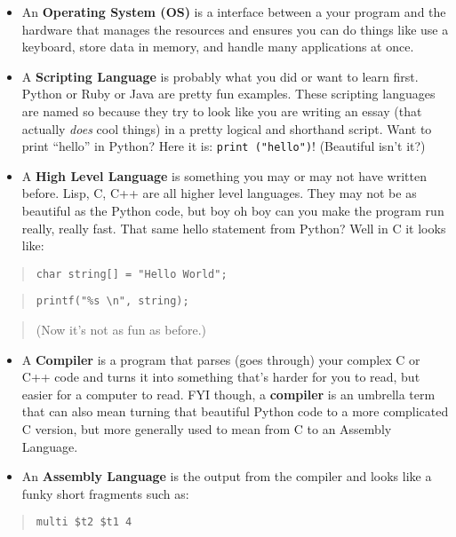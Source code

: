 \documentclass[landscape]{article}
\begin{document}
\begin{multicols}{3}
\begin{itemize}
\item
  An \textbf{Operating System (OS)} is a interface between a your
  program and the hardware that manages the resources and ensures you
  can do things like use a keyboard, store data in memory, and handle
  many applications at once.
\item
  A \textbf{Scripting Language} is probably what you did or want to
  learn first. Python or Ruby or Java are pretty fun examples. These
  scripting languages are named so because they try to look like you are
  writing an essay (that actually \emph{does} cool things) in a pretty
  logical and shorthand script. Want to print ``hello'' in Python? Here
  it is: \texttt{print ("hello")}! (Beautiful isn't it?)
\item
  A \textbf{High Level Language} is something you may or may not have
  written before. Lisp, C, C++ are all higher level languages. They may
  not be as beautiful as the Python code, but boy oh boy can you make
  the program run really, really fast. That same hello statement from
  Python? Well in C it looks like:
\end{itemize}

\begin{quote}
\texttt{char string{[}{]} = "Hello World";}
\end{quote}

\begin{quote}
\texttt{printf("\%s \textbackslash{}n", string);}
\end{quote}

\begin{quote}
(Now it's not as fun as before.)
\end{quote}

\begin{itemize}
\item
  A \textbf{Compiler} is a program that parses (goes through) your
  complex C or C++ code and turns it into something that's harder for
  you to read, but easier for a computer to read. FYI though, a
  \textbf{compiler} is an umbrella term that can also mean turning that
  beautiful Python code to a more complicated C version, but more
  generally used to mean from C to an Assembly Language.
\item
  An \textbf{Assembly Language} is the output from the compiler and
  looks like a funky short fragments such as:
\end{itemize}

\begin{quote}
\texttt{multi \$t2 \$t1 4}
\end{quote}


\end{multicols}
\end{document}
